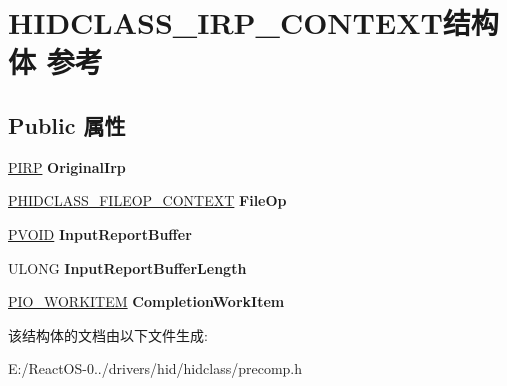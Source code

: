 \hypertarget{struct_h_i_d_c_l_a_s_s___i_r_p___c_o_n_t_e_x_t}{}\section{H\+I\+D\+C\+L\+A\+S\+S\+\_\+\+I\+R\+P\+\_\+\+C\+O\+N\+T\+E\+X\+T结构体 参考}
\label{struct_h_i_d_c_l_a_s_s___i_r_p___c_o_n_t_e_x_t}
\subsection*{Public 属性}
\begin{DoxyCompactItemize}
\item 
\mbox{\label{struct_h_i_d_c_l_a_s_s___i_r_p___c_o_n_t_e_x_t_a19484228f705cddc68a22fc43e1b06ec}} 
\hyperlink{interfacevoid}{P\+I\+RP} {\bfseries Original\+Irp}
\item 
\mbox{\label{struct_h_i_d_c_l_a_s_s___i_r_p___c_o_n_t_e_x_t_a415dd35165a249674dd7e78ba87c2198}} 
\hyperlink{struct_____h_i_d_c_l_a_s_s___f_i_l_e_o_p___c_o_n_t_e_x_t____}{P\+H\+I\+D\+C\+L\+A\+S\+S\+\_\+\+F\+I\+L\+E\+O\+P\+\_\+\+C\+O\+N\+T\+E\+XT} {\bfseries File\+Op}
\item 
\mbox{\label{struct_h_i_d_c_l_a_s_s___i_r_p___c_o_n_t_e_x_t_a595337c824007df0a84b1d28ed0bd78c}} 
\hyperlink{interfacevoid}{P\+V\+O\+ID} {\bfseries Input\+Report\+Buffer}
\item 
\mbox{\label{struct_h_i_d_c_l_a_s_s___i_r_p___c_o_n_t_e_x_t_a8b2f1b9116b3e93c8923c1f08d4a9086}} 
U\+L\+O\+NG {\bfseries Input\+Report\+Buffer\+Length}
\item 
\mbox{\label{struct_h_i_d_c_l_a_s_s___i_r_p___c_o_n_t_e_x_t_a8ff865b9e5b4239c1789364e463dbeac}} 
\hyperlink{struct___i_o___w_o_r_k_i_t_e_m}{P\+I\+O\+\_\+\+W\+O\+R\+K\+I\+T\+EM} {\bfseries Completion\+Work\+Item}
\end{DoxyCompactItemize}


该结构体的文档由以下文件生成\+:\begin{DoxyCompactItemize}
\item 
E\+:/\+React\+O\+S-\/0../drivers/hid/hidclass/precomp.\+h\end{DoxyCompactItemize}

